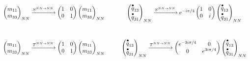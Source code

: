 \begin{align}
\xymatrix{
{\left( \begin{matrix}
m_{11}\\
m_{33}\\
\end{matrix} \right)_{NN}
\xrightarrow{S^{NN \rightarrow NN}}
 \left( \begin{matrix}
1&0\\
0&1\\
\end{matrix} \right)
\left( \begin{matrix}
m_{11}\\
m_{33}\\
\end{matrix} \right)_{NN}}
&
{
\left( \begin{matrix}
\stackrel{\bullet}{q}_{13}\\
\stackrel{\bullet}{q}_{31}\\
\end{matrix} \right)_{NN}
\xrightarrow{S^{NN \rightarrow NN}}
e^{- i \pi /4}\left( \begin{matrix}
1&0\\
0&i\\
\end{matrix} \right)
\left( \begin{matrix}
\stackrel{\bullet}{q}_{13}\\
\stackrel{\bullet}{q}_{31}\\
\end{matrix} \right)_{NN} 
}
\\
{
\left( \begin{matrix}
m_{11}\\
m_{33}\\
\end{matrix} \right)_{NN}
\xrightarrow{T^{NN \rightarrow NN}}
 \left( \begin{matrix}
1&0\\
0&1\\
\end{matrix} \right)
\left( \begin{matrix}
m_{11}\\
m_{33}\\
\end{matrix} \right)_{NN}
} & 
{
\left( \begin{matrix}
\stackrel{\bullet}{q}_{13}\\
\stackrel{\bullet}{q}_{31}\\
\end{matrix} \right)_{NN}
\xrightarrow{T^{NN \rightarrow NN}}
\left( \begin{matrix}
e^{-3i \pi /4}&0\\
0&e^{3 i \pi /4}\\
\end{matrix} \right)
\left( \begin{matrix}
\stackrel{\bullet}{q}_{13}\\
\stackrel{\bullet}{q}_{31}\\
\end{matrix} \right)_{NN}
}
} 
\end{align}
